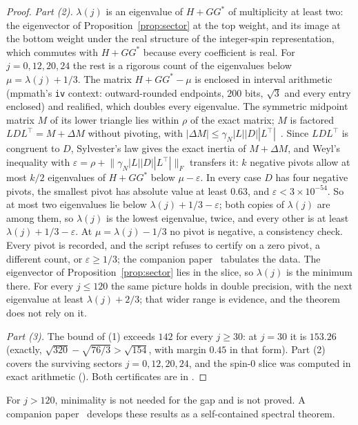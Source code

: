 \documentclass[11pt]{article}
\theoremstyle{definition}
\theoremstyle{remark}
\newcommand{\norm}[1]{\lVert #1\rVert}
\begin{document}
\begin{proof}
\emph{Part (2).} $\lambda(j)$ is an eigenvalue of $H+GG^*$ of multiplicity at least two: the
eigenvector of Proposition~\ref{prop:sector} at the top weight, and its image at the bottom weight
under the real structure of the integer-spin representation, which commutes with $H+GG^*$ because
every coefficient is real. For $j=0,12,20,24$ the rest is a rigorous count of the eigenvalues below
$\mu=\lambda(j)+1/3$. The matrix $H+GG^*-\mu$ is enclosed in interval arithmetic (mpmath's \texttt{iv}
context: outward-rounded endpoints, $200$ bits, $\sqrt3$ and every entry enclosed) and realified, which
doubles every eigenvalue. The symmetric midpoint matrix $M$ of its lower triangle lies within $\rho$ of
the exact matrix; $M$ is factored $LDL^\top=M+\Delta M$ without pivoting, with
$|\Delta M|\le\gamma_N|L||D||L^\top|$~\cite[Thm.~9.3]{higham2002}. Since $LDL^\top$ is congruent to $D$,
Sylvester's law gives the exact inertia of $M+\Delta M$, and Weyl's inequality with
$\varepsilon=\rho+\norm{\gamma_N|L||D||L^\top|}_F$ transfers it: $k$ negative pivots allow at most $k/2$
eigenvalues of $H+GG^*$ below $\mu-\varepsilon$. In every case $D$ has four negative pivots, the
smallest pivot has absolute value at least $0.63$, and $\varepsilon<3\times10^{-54}$. So at most two
eigenvalues lie below $\lambda(j)+1/3-\varepsilon$; both copies of $\lambda(j)$ are among them, so
$\lambda(j)$ is the lowest eigenvalue, twice, and every other is at least $\lambda(j)+1/3-\varepsilon$.
At $\mu=\lambda(j)-1/3$ no pivot is negative, a consistency check. Every pivot is recorded, and the
script refuses to certify on a zero pivot, a different count, or $\varepsilon\ge1/3$; the companion
paper~\cite{davisberger} tabulates the data. The
eigenvector of Proposition~\ref{prop:sector} lies in the slice, so $\lambda(j)$ is the minimum there.
For every $j\le120$ the same picture holds in double precision, with the next eigenvalue at least
$\lambda(j)+2/3$; that wider range is evidence, and the theorem does not rely on it.

\emph{Part (3).} The bound of (1) exceeds $142$ for every $j\ge30$: at $j=30$ it is $153.26$
(exactly, $\sqrt{320}-\sqrt{76/3}>\sqrt{154}$, with margin $0.45$ in that form). Part (2) covers the surviving sectors $j=0,12,20,24$, and the spin-$0$
slice was computed in exact arithmetic (). Both
certificates are in .
\end{proof}

For $j>120$, minimality is not needed for the gap and is not proved. A companion
paper~\cite{davisberger} develops these results as a self-contained spectral theorem.
\end{document}
